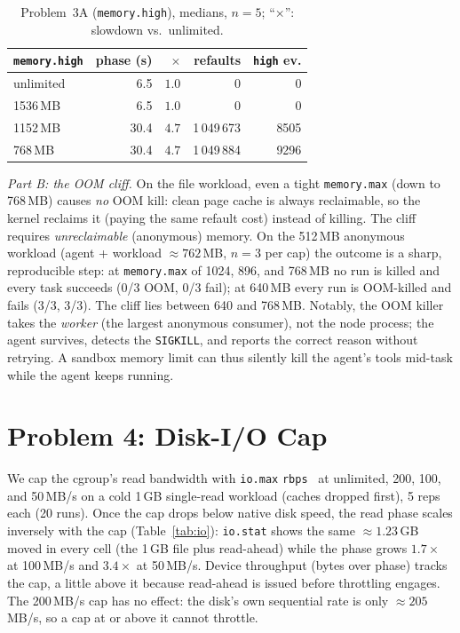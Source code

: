 \documentclass[10pt,conference]{IEEEtran}
\newcommand{\uu}[1]{\,\textsf{#1}}
\begin{document}
\begin{table}[t]\centering\scriptsize
\setlength{\tabcolsep}{4pt}
\caption{Problem~3A (\texttt{memory.high}), medians, $n{=}5$;
``$\times$'': slowdown vs.\ unlimited.}
\label{tab:mem}
\begin{tabular}{@{}lrrrr@{}}
\toprule
\texttt{memory.high} & phase (s) & $\times$ & refaults & \texttt{high} ev.\\
\midrule
unlimited & 6.5  & $1.0$ & 0            & 0 \\
1536\,MB  & 6.5  & $1.0$ & 0            & 0 \\
1152\,MB  & 30.4 & $4.7$ & 1\,049\,673  & 8505 \\
768\,MB   & 30.4 & $4.7$ & 1\,049\,884  & 9296 \\
\bottomrule
\end{tabular}
\end{table}

\emph{Part B: the OOM cliff.} On the file workload, even a tight
\texttt{memory.max} (down to 768\,MB) causes \emph{no} OOM kill: clean page
cache is always reclaimable, so the kernel reclaims it (paying the same
refault cost) instead of killing. The cliff requires \emph{unreclaimable}
(anonymous) memory. On the 512\,MB anonymous workload (agent + workload
${\approx}762$\,MB, $n{=}3$ per cap) the outcome is a sharp, reproducible
step: at \texttt{memory.max} of 1024, 896, and 768\,MB no run is killed
and every task succeeds (0/3 OOM, 0/3 fail); at 640\,MB every run is
OOM-killed and fails (3/3, 3/3). The cliff lies between 640 and 768\,MB. Notably, the OOM killer takes the \emph{worker} (the largest
anonymous consumer), not the node process; the agent survives, detects the
\texttt{SIGKILL}, and reports the correct reason without retrying. A
sandbox memory limit can thus silently kill the agent's tools mid-task
while the agent keeps running.

\section{Problem 4: Disk-I/O Cap}
\label{sec:io}

We cap the cgroup's read bandwidth with \texttt{io.max}
\texttt{rbps}~\cite{cgroupv2} at unlimited, 200, 100, and 50\uu{MB/s} on a
cold 1\,GB single-read workload (caches dropped first), 5 reps each (20
runs). Once the cap drops below native disk speed, the read phase scales
inversely with the cap (Table~\ref{tab:io}): \texttt{io.stat} shows the
same ${\approx}1.23$\,GB moved in every cell (the 1\,GB file plus
read-ahead) while the phase grows $1.7\times$ at 100\uu{MB/s} and
$3.4\times$ at 50\uu{MB/s}. Device throughput (bytes over phase) tracks the cap, a little above it
because read-ahead is issued before throttling engages. The 200\uu{MB/s} cap has no effect: the disk's
own sequential rate is only ${\approx}205$\uu{MB/s}, so a cap at or above
it cannot throttle.
\end{document}
